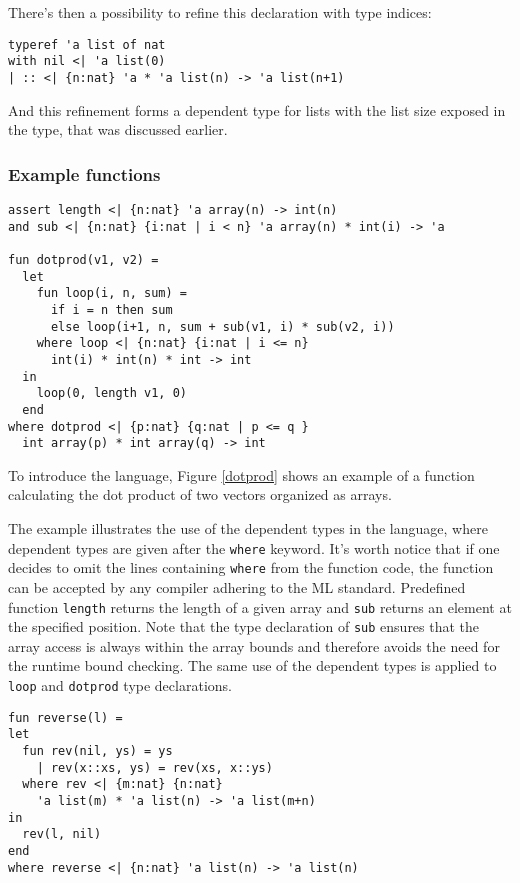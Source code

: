 \documentclass[a4paper,UKenglish]{lipics-v2016}
\begin{document}
There's then a possibility to refine this declaration with type indices:
\begin{verbatim}
typeref 'a list of nat
with nil <| 'a list(0)
| :: <| {n:nat} 'a * 'a list(n) -> 'a list(n+1)
\end{verbatim}

And this refinement forms a dependent type for lists with the list size exposed
in the type, that was discussed earlier.

\subsubsection{Example functions}

\begin{lstlisting}[caption={The dot product function},label=dotprod,captionpos=t,float,abovecaptionskip=-\medskipamount]
assert length <| {n:nat} 'a array(n) -> int(n)
and sub <| {n:nat} {i:nat | i < n} 'a array(n) * int(i) -> 'a

fun dotprod(v1, v2) =
  let
    fun loop(i, n, sum) =
      if i = n then sum
      else loop(i+1, n, sum + sub(v1, i) * sub(v2, i))
    where loop <| {n:nat} {i:nat | i <= n}
      int(i) * int(n) * int -> int
  in
    loop(0, length v1, 0)
  end
where dotprod <| {p:nat} {q:nat | p <= q }
  int array(p) * int array(q) -> int
\end{lstlisting}

To introduce the language, Figure \ref{dotprod} shows an example of a function
calculating the dot product of two vectors organized as arrays.

The example illustrates the use of the dependent types in the language, where
dependent types are given after the \texttt{where} keyword. It's worth notice
that if one decides to omit the lines containing \texttt{where} from the
function code, the function can be accepted by any compiler adhering to the ML
standard. Predefined function \texttt{length} returns the length of a given
array and \texttt{sub} returns an element at the specified position. Note that
the type declaration of \texttt{sub} ensures that the array access is always
within the array bounds and therefore avoids the need for the runtime bound
checking. The same use of the dependent types is applied to \texttt{loop} and
\texttt{dotprod} type declarations.

\begin{lstlisting}[caption={The reverse function for lists},label=reverse,captionpos=t,float,abovecaptionskip=-\medskipamount]
fun reverse(l) =
let
  fun rev(nil, ys) = ys
    | rev(x::xs, ys) = rev(xs, x::ys)
  where rev <| {m:nat} {n:nat}
    'a list(m) * 'a list(n) -> 'a list(m+n)
in
  rev(l, nil)
end
where reverse <| {n:nat} 'a list(n) -> 'a list(n)
\end{lstlisting}
\end{document}
